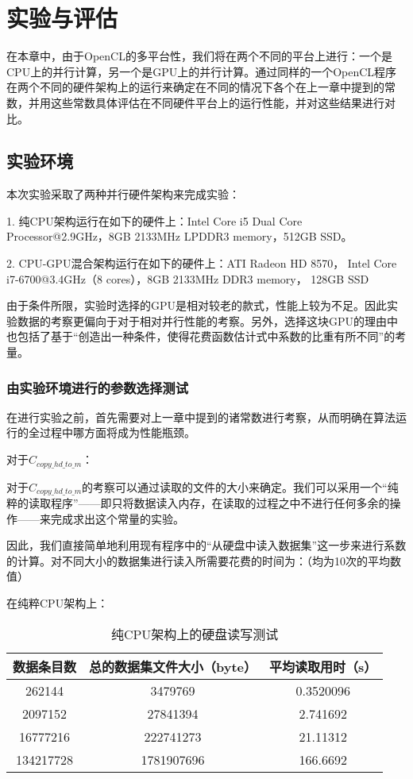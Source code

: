 \chapter{实验与评估}


在本章中，由于OpenCL的多平台性，我们将在两个不同的平台上进行：一个是CPU上的并行计算，另一个是GPU上的并行计算。通过同样的一个OpenCL程序在两个不同的硬件架构上的运行来确定在不同的情况下各个在上一章中提到的常数，并用这些常数具体评估在不同硬件平台上的运行性能，并对这些结果进行对比。

\section{实验环境}
本次实验采取了两种并行硬件架构来完成实验：

1. 纯CPU架构运行在如下的硬件上：Intel Core i5 Dual Core Processor@2.9GHz，8GB 2133MHz LPDDR3 memory，512GB SSD。

2. CPU-GPU混合架构运行在如下的硬件上：ATI Radeon HD 8570， Intel Core i7-6700@3.4GHz（8 cores），8GB 2133MHz DDR3 memory， 128GB SSD

由于条件所限，实验时选择的GPU是相对较老的款式，性能上较为不足。因此实验数据的考察更偏向于对于相对并行性能的考察。另外，选择这块GPU的理由中也包括了基于“创造出一种条件，使得花费函数估计式中系数的比重有所不同”的考量。

\subsection{由实验环境进行的参数选择测试}
在进行实验之前，首先需要对上一章中提到的诸常数进行考察，从而明确在算法运行的全过程中哪方面将成为性能瓶颈。

对于$C_{copy\_hd\_to\_m}$：

对于$C_{copy\_hd\_to\_m}$的考察可以通过读取的文件的大小来确定。我们可以采用一个“纯粹的读取程序”——即只将数据读入内存，在读取的过程之中不进行任何多余的操作——来完成求出这个常量的实验。

因此，我们直接简单地利用现有程序中的“从硬盘中读入数据集”这一步来进行系数的计算。对不同大小的数据集进行读入所需要花费的时间为：（均为10次的平均数值）

在纯粹CPU架构上：
\begin{table}[!htbp]
\centering
\caption{纯CPU架构上的硬盘读写测试} 
\label{tab:table1}
\begin{tabular}{|c|c|c|}
    \hline
    数据条目数 & 总的数据集文件大小（byte） & 平均读取用时（s）\\
    \hline
    262144 & 3479769 & 0.3520096\\
    \hline
    2097152 & 27841394 & 2.741692\\
    \hline
    16777216 & 222741273 & 21.11312\\
    \hline
    134217728 & 1781907696 & 166.6692\\
    \hline
\end{tabular}
\end{table}

